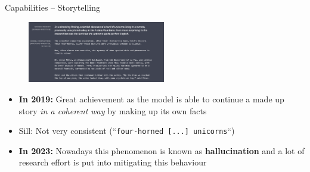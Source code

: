 
\begin{frame}{Capabilities -- Storytelling}

\vfill

\begin{figure}
\centering
\includegraphics[width = 6cm]{figure/72-gpt2-story.png}\\ 
\end{figure}

\begin{itemize}
	\item \textbf{In 2019:} Great achievement as the model is able to continue a made up story \textit{in a coherent way} by making up its own facts
	\item[] Sill: Not very consistent (``\texttt{four-horned [...] unicorns}``)
	\item \textbf{In 2023:} Nowadays this phenomenon is known as \textbf{hallucination} and a lot of research effort is put into mitigating this behaviour
\end{itemize}

\vfill

\end{frame}


